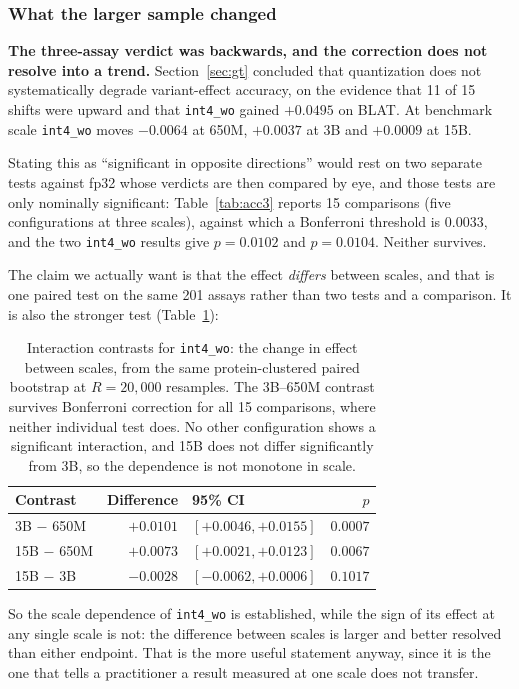 \documentclass[11pt]{article}
\newcommand{\cfg}[1]{\texttt{#1}}
\begin{document}
\subsubsection{What the larger sample changed}

\textbf{The three-assay verdict was backwards, and the correction does not
resolve into a trend.} Section~\ref{sec:gt} concluded that quantization does not
systematically degrade variant-effect accuracy, on the evidence that 11 of 15
shifts were upward and that \cfg{int4\_wo} gained $+0.0495$ on BLAT. At
benchmark scale \cfg{int4\_wo} moves $-0.0064$ at 650M, $+0.0037$ at 3B and
$+0.0009$ at 15B.

Stating this as ``significant in opposite directions'' would rest on two
separate tests against fp32 whose verdicts are then compared by eye, and those
tests are only nominally significant: Table~\ref{tab:acc3} reports 15
comparisons (five configurations at three scales), against which a Bonferroni
threshold is $0.0033$, and the two \cfg{int4\_wo} results give $p = 0.0102$ and
$p = 0.0104$. Neither survives.

The claim we actually want is that the effect \emph{differs} between scales,
and that is one paired test on the same 201 assays rather than two tests and a
comparison. It is also the stronger test (Table~\ref{tab:interaction}):

\begin{table}[htb]
\centering
\caption{Interaction contrasts for \cfg{int4\_wo}: the change in effect between
scales, from the same protein-clustered paired bootstrap at $R = 20{,}000$
resamples. The 3B--650M contrast survives Bonferroni correction for all 15
comparisons, where neither individual test does. No other configuration shows a
significant interaction, and 15B does not differ significantly from 3B, so the
dependence is not monotone in scale.}
\label{tab:interaction}
\small
\begin{tabular}{lrlr}
\toprule
Contrast & Difference & 95\% CI & $p$ \\
\midrule
3B $-$ 650M  & $+0.0101$ & $[+0.0046,+0.0155]$ & $\mathbf{0.0007}$ \\
15B $-$ 650M & $+0.0073$ & $[+0.0021,+0.0123]$ & $0.0067$ \\
15B $-$ 3B   & $-0.0028$ & $[-0.0062,+0.0006]$ & $0.1017$ \\
\bottomrule
\end{tabular}
\end{table}

So the scale dependence of \cfg{int4\_wo} is established, while the sign of its
effect at any single scale is not: the difference between scales is larger and
better resolved than either endpoint. That is the more useful statement anyway,
since it is the one that tells a practitioner a result measured at one scale
does not transfer.
\end{document}
